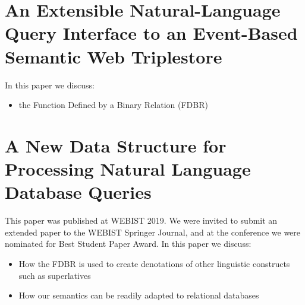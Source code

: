 \documentclass[../main.tex]{subfiles}
\begin{document}
\begin{refsection}
%


\section{An Extensible Natural-Language Query Interface to an Event-Based Semantic Web Triplestore}

In this paper we discuss:

\begin{itemize}
    \item the Function Defined by a Binary Relation (FDBR)
\end{itemize}


\section{A New Data Structure for Processing Natural Language Database Queries}


This paper was published at WEBIST 2019.  We were invited to submit an extended paper to the WEBIST Springer Journal, and at the conference we were nominated for Best Student Paper Award.  In this paper we discuss:

\begin{itemize}
    \item How the FDBR is used to create denotations of other linguistic constructs such as superlatives
    \item How our semantics can be readily adapted to relational databases
\end{itemize}


\end{refsection}
\end{document}
